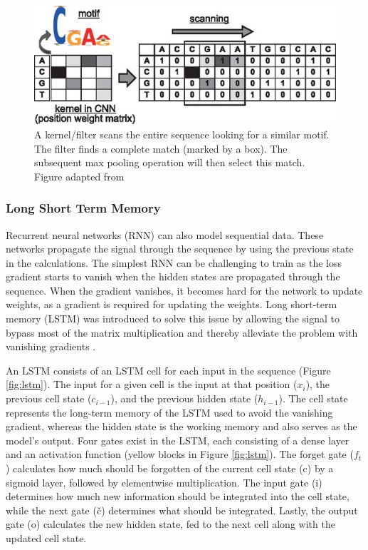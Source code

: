 \begin{figure}
    \centering
    \includegraphics[width=0.9\linewidth]{figures/cnn.jpeg}
    \caption{A kernel/filter scans the entire sequence looking for a similar motif. The filter finds a complete match (marked by a box). The subsequent max pooling operation will then select this match. Figure adapted from \cite{Aoki2018ConvolutionalSequences}}
    \label{fig:cnn}
\end{figure}

\subsubsection{Long Short Term Memory}
Recurrent neural networks (RNN) can also model sequential data. These networks propagate the signal through the sequence by using the previous state in the calculations. The simplest RNN can be challenging to train as the loss gradient starts to vanish when the hidden states are propagated through the sequence. When the gradient vanishes, it becomes hard for the network to update weights, as a gradient is required for updating the weights. Long short-term memory (LSTM) was introduced to solve this issue by allowing the signal to bypass most of the matrix multiplication and thereby alleviate the problem with vanishing gradients \cite{hochreiter1997long}.

An LSTM consists of an LSTM cell for each input in the sequence (Figure \ref{fig:lstm}). The input for a given cell is the input at that position ($x_i$), the previous cell state ($c_{i-1}$), and the previous hidden state ($h_{i-1}$). The cell state represents the long-term memory of the LSTM used to avoid the vanishing gradient, whereas the hidden state is the working memory and also serves as the model's output. Four gates exist in the LSTM, each consisting of a dense layer and an activation function (yellow blocks in Figure \ref{fig:lstm}). The forget gate ($f_t$) calculates how much should be forgotten of the current cell state (c) by a sigmoid layer, followed by elementwise multiplication. The input gate (i) determines how much new information should be integrated into the cell state, while the next gate (\v{c}) determines what should be integrated. Lastly, the output gate (o) calculates the new hidden state, fed to the next cell along with the updated cell state.

